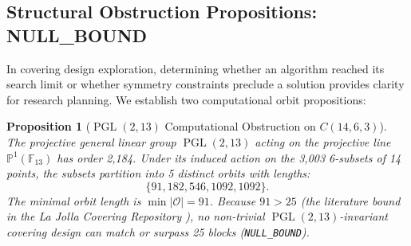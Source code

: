 \documentclass[11pt,a4paper]{article}
\newtheorem{proposition}[theorem]{Proposition}
\begin{document}
\begin{table}[h]
\centering
\small
\caption{Bivariate Bicycle Quantum Stabilizer Codes in Program D047.}
\label{tab:bivariate_codes}
\end{table}

\subsection{Structural Obstruction Propositions: NULL\_BOUND}
\label{sec:structural_null}
In covering design exploration, determining whether an algorithm reached its search limit or whether symmetry constraints preclude a solution provides clarity for research planning. We establish two computational orbit propositions:

\begin{proposition}[$\operatorname{PGL}(2, 13)$ Computational Obstruction on $C(14, 6, 3)$]
\label{prop:pgl2_13}
The projective general linear group $\operatorname{PGL}(2, 13)$ acting on the projective line $\mathbb{P}^1(\mathbb{F}_{13})$ has order 2,184. Under its induced action on the 3,003 6-subsets of 14 points, the subsets partition into 5 distinct orbits with lengths:
\begin{equation}
\{91, 182, 546, 1092, 1092\}.
\end{equation}
The minimal orbit length is $\min |\mathcal{O}| = 91$. Because $91 > 25$ (the literature bound in the La Jolla Covering Repository \cite{gordon2026ljcr}), no non-trivial $\operatorname{PGL}(2, 13)$-invariant covering design can match or surpass 25 blocks (\texttt{NULL\_BOUND}).
\end{proposition}
\end{document}
